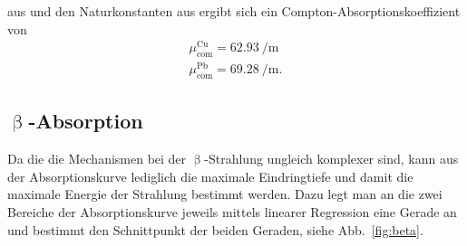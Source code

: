 aus \cite{chemie.de} und den Naturkonstanten aus \cite{codata} ergibt sich ein Compton-Absorptionskoeffizient von
\begin{align}
  \mu_\text{com}^\text{Cu} = \SI{62.93}{\per\meter} \\
  \mu_\text{com}^\text{Pb} = \SI{69.28}{\per\meter}.
\end{align}




\FloatBarrier
\subsection{\texorpdfstring{$\upbeta$}{β}-Absorption}
Da die die Mechanismen bei der $\upbeta$-Strahlung ungleich komplexer sind, kann aus der Absorptionskurve lediglich die maximale Eindringtiefe und damit die maximale Energie der Strahlung bestimmt werden. Dazu legt man an die zwei Bereiche der Absorptionskurve jeweils mittels linearer Regression eine Gerade an und bestimmt den Schnittpunkt der beiden Geraden, siehe Abb.~\ref{fig:beta}.

